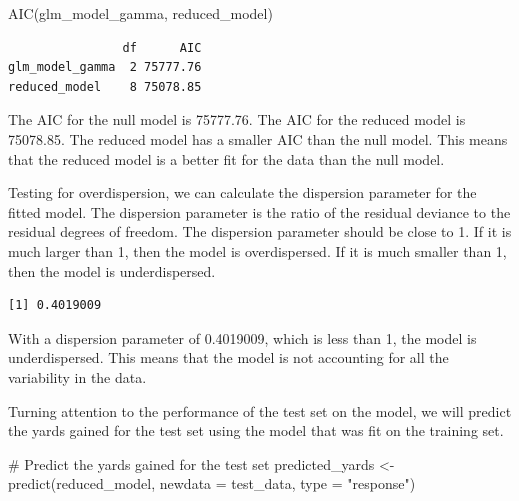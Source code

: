 \documentclass[
  super,
  preprint,
  3p]{elsarticle}
\newenvironment{Shaded}{\begin{snugshade}}{\end{snugshade}}
\newcommand{\AttributeTok}[1]{\textcolor[rgb]{0.40,0.45,0.13}{#1}}
\newcommand{\CommentTok}[1]{\textcolor[rgb]{0.37,0.37,0.37}{#1}}
\newcommand{\FunctionTok}[1]{\textcolor[rgb]{0.28,0.35,0.67}{#1}}
\newcommand{\NormalTok}[1]{\textcolor[rgb]{0.00,0.23,0.31}{#1}}
\newcommand{\OtherTok}[1]{\textcolor[rgb]{0.00,0.23,0.31}{#1}}
\newcommand{\SpecialCharTok}[1]{\textcolor[rgb]{0.37,0.37,0.37}{#1}}
\newcommand{\StringTok}[1]{\textcolor[rgb]{0.13,0.47,0.30}{#1}}
\begin{document}
\begin{Shaded}
\begin{Highlighting}[]
\FunctionTok{AIC}\NormalTok{(glm\_model\_gamma, reduced\_model)}
\end{Highlighting}
\end{Shaded}

\begin{verbatim}
                df      AIC
glm_model_gamma  2 75777.76
reduced_model    8 75078.85
\end{verbatim}

The AIC for the null model is 75777.76. The AIC for the reduced model is
75078.85. The reduced model has a smaller AIC than the null model. This
means that the reduced model is a better fit for the data than the null
model.

Testing for overdispersion, we can calculate the dispersion parameter
for the fitted model. The dispersion parameter is the ratio of the
residual deviance to the residual degrees of freedom. The dispersion
parameter should be close to 1. If it is much larger than 1, then the
model is overdispersed. If it is much smaller than 1, then the model is
underdispersed.

\begin{Shaded}
\end{Shaded}

\begin{verbatim}
[1] 0.4019009
\end{verbatim}

With a dispersion parameter of 0.4019009, which is less than 1, the
model is underdispersed. This means that the model is not accounting for
all the variability in the data.

Turning attention to the performance of the test set on the model, we
will predict the yards gained for the test set using the model that was
fit on the training set.

\begin{Shaded}
\begin{Highlighting}[]
\CommentTok{\# Predict the yards gained for the test set}
\NormalTok{predicted\_yards }\OtherTok{\textless{}{-}} \FunctionTok{predict}\NormalTok{(reduced\_model, }\AttributeTok{newdata =}\NormalTok{ test\_data, }\AttributeTok{type =} \StringTok{"response"}\NormalTok{)}
\end{Highlighting}
\end{Shaded}
\end{document}
